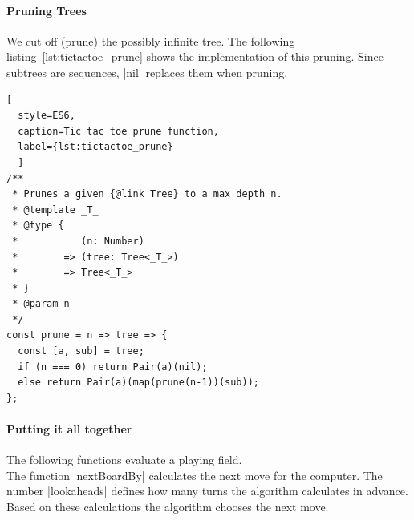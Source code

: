 \paragraph{Pruning Trees} 
We cut off (prune) the possibly infinite tree. The following
listing~\ref{lst:tictactoe_prune} shows the implementation of this pruning.
Since subtrees are sequences, |nil| replaces them when pruning.

\begin{lstlisting}[
  style=ES6, 
  caption=Tic tac toe prune function,
  label={lst:tictactoe_prune}
  ]
/**
 * Prunes a given {@link Tree} to a max depth n.
 * @template _T_
 * @type {
 *           (n: Number)
 *        => (tree: Tree<_T_>)
 *        => Tree<_T_>
 * }
 * @param n
 */
const prune = n => tree => {
  const [a, sub] = tree;
  if (n === 0) return Pair(a)(nil);
  else return Pair(a)(map(prune(n-1))(sub));
};
\end{lstlisting}

\paragraph{Putting it all together}
The following functions evaluate a playing field. \\ 
The function |nextBoardBy| calculates the next move for the computer. The
number |lookaheads| defines how many turns the algorithm calculates in advance.
Based on these calculations the algorithm chooses the next move.

